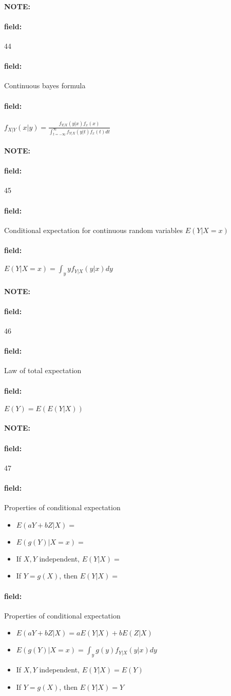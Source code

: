 \documentclass[12pt]{article}
\newenvironment{note}{\paragraph{NOTE:}}{}
\newenvironment{field}{\paragraph{field:}}{}
\begin{document}
\begin{note}
  \begin{field}
    \tiny 44
  \end{field}
  \begin{field}
    Continuous bayes formula
  \end{field}
  \begin{field}
    $f_{X|Y}(x|y)  = \frac{f_{Y|X}(y|x)f_x(x)}{\int_{t = -\infty}^\infty f_{Y|X}(y|t)f_x(t)dt}$
  \end{field}
\end{note}


\begin{note}
  \begin{field}
    \tiny 45
  \end{field}
  \begin{field}
    Conditional expectation for continuous random variables
    $E(Y|X = x)$
  \end{field}
  \begin{field}
    $E(Y|X = x) = \int_y y f_{Y|X}(y|x)dy$
  \end{field}
\end{note}

\begin{note}
  \begin{field}
    \tiny 46
  \end{field}
  \begin{field}
    Law of total expectation
  \end{field}
  \begin{field}
    $E(Y) = E(E(Y|X))$
  \end{field}
\end{note}

\begin{note}
  \begin{field}
    \tiny 47
  \end{field}
  \begin{field}
    Properties of conditional expectation
    \begin{itemize}
      \item $E(aY + bZ | X) = $
      \item $E(g(Y)|X=x) = $
      \item If $X,Y$ independent, $E(Y|X) = $
      \item If $Y = g(X)$, then $E(Y|X) = $
    \end{itemize}
  \end{field}
  \begin{field}
    Properties of conditional expectation
    \begin{itemize}
      \item $E(aY + bZ | X) = a E(Y|X) + bE(Z|X)$
      \item $E(g(Y)|X=x) = \int_y g(y) f_{Y|X}(y|x)dy$
      \item If $X,Y$ independent, $E(Y|X) = E(Y)$
      \item If $Y = g(X)$, then $E(Y|X) = Y$
    \end{itemize}
  \end{field}
\end{note}
\end{document}
